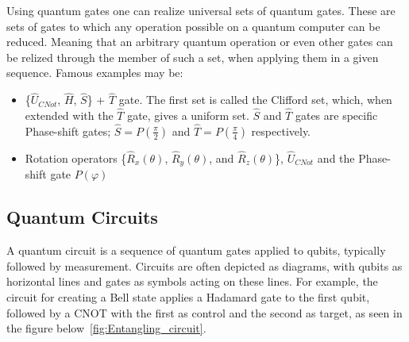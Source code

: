 \documentclass[encoding=utf8,british]{tumphthesis}
\begin{document}
        Using quantum gates one can realize universal sets of quantum gates. These are sets of gates to which any operation possible on a 
        quantum computer can be reduced. Meaning that an arbitrary quantum operation or even other gates can be relized through the member of such a set, 
        when applying them in a given sequence. Famous examples may be:
        \begin{itemize}
            \item \{$\hat{U}_{CNot}$, $\hat{H}$, $\hat{S}$\} + $\hat{T}$ gate. The first set is called the Clifford set, which, when extended with 
            the $\hat{T}$ gate, gives a uniform set. $\hat{S}$ and $\hat{T}$ gates are specific Phase-shift gates; $\hat{S} = P(\frac{\pi}{2})$ 
            and $\hat{T} = P(\frac{\pi}{4})$ respectively.
            \item Rotation operators \{$\hat{R}_x(\theta)$, $\hat{R}_y(\theta)$, and $\hat{R}_z(\theta)$\}, $\hat{U}_{CNot}$ and the Phase-shift gate $P(\varphi)$
        \end{itemize}

        \subsection{Quantum Circuits}
        A quantum circuit is a sequence of quantum gates applied to qubits, typically followed by measurement. Circuits are often depicted 
        as diagrams, with qubits as horizontal lines and gates as symbols acting on these lines. For example, the circuit for creating a 
        Bell state applies a Hadamard gate to the first qubit, followed by a CNOT with the first as control and the second as target, as 
        seen in the figure below~\ref{fig:Entangling_circuit}.
\end{document}
